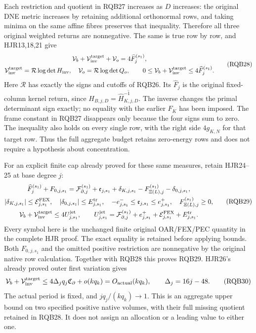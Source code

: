 \documentclass[10pt]{article}
\begin{document}
Each restriction and quotient in RQB27 increases as $D$ increases:
the original DNE metric increases by retaining additional orthonormal
rows, and taking minima on the same affine fibres preserves that
inequality. Therefore all three original weighted returns are
nonnegative. The same is true row by row, and HJR13,18,21 give
\[
\begin{gathered}
 \mathcal V_b+\mathcal V_{\rm inv}^{\rm target}+\mathcal V_o
               =4\widehat F_j^{(s_1)},\\
 \mathcal V_{\rm inv}^{\rm target}
       =\mathcal R\log\det H_{\rm inv},\quad
 \mathcal V_o=\mathcal R\log\det Q_o,\qquad
 0\le\mathcal V_b+\mathcal V_{\rm inv}^{\rm target}
                         \le4\widehat F_j^{(s_1)} .
\end{gathered}\tag{RQB28}
\]
Here $\mathcal R$ has exactly the signs and cutoffs of RQB26.
Its $\widehat F_j$ is the original fixed-column kernel return,
since $H_{B,j,D}=\overline{\widehat H_{K,j,D}^{-1}}$.
The inverse changes the primal determinant sign exactly;
no equality with the earlier $F_K$ has been imposed.
The frame constant in RQB27 disappears only because the four
signs sum to zero. The inequality also holds on every single
row, with the right side $4g_{K,N}$ for that target row.
Thus the full aggregate budget retains zero-energy rows and
does not require a hypothesis about concentration.

For an explicit finite cap already proved for these same measures,
retain HJR24--25 at base degree $j$:
\[
\begin{gathered}
 \widehat F_j^{(s_1)}+F_{0,j,s_1}
 =\mathcal F_{\partial,j}^{(s_1)}+\mathfrak e_{j,s_1}
       +\delta_{K,j,s_1}-F_{\Xi(L),j}^{(s_1)}-\delta_{0,j,s_1},\\
 |\delta_{K,j,s_1}|\le\mathcal E_{j,s_1}^{\rm FEX},\quad
 |\delta_{0,j,s_1}|\le E_{j,s_1}^{\rm tr},\quad
 -e_{j,s_1}^-\le\mathfrak e_{j,s_1}\le e_{j,s_1}^+,\quad
 F_{\Xi(L),j}^{(s_1)}\ge0,\\
 \mathcal V_b+\mathcal V_{\rm inv}^{\rm target}
  \le4U_{j,s_1}^{\rm jet},\qquad
 U_{j,s_1}^{\rm jet}
 =\mathcal F_{\partial,j}^{(s_1)}
       +e_{j,s_1}^++\mathcal E_{j,s_1}^{\rm FEX}+E_{j,s_1}^{\rm tr}.
\end{gathered}\tag{RQB29}
\]
Every symbol here is the unchanged finite original OAR/FEX/PEC
quantity in the complete HJR proof. The exact equality is retained
before applying bounds. Both $F_{0,j,s_1}$ and the omitted positive
restriction are nonnegative by the original native row calculation.
Together with RQB28 this proves RQB29. HJR26's already proved
outer first variation gives
\[
 \mathcal V_b+\mathcal V_{\rm inv}^{\rm target}
   \le4\Delta_jq_j\mathfrak C_\partial+o(kq_k)
                =O_{\rm actual}(kq_k),\qquad \Delta_j=16j-48 .
 \tag{RQB30}
\]
The actual period is fixed, and $j q_j/(kq_k)\to1$.
This is an aggregate upper bound on two specified positive
native volumes, with their full missing quotient retained in RQB28.
It does not assign an allocation or a leading value to either one.
\end{document}
